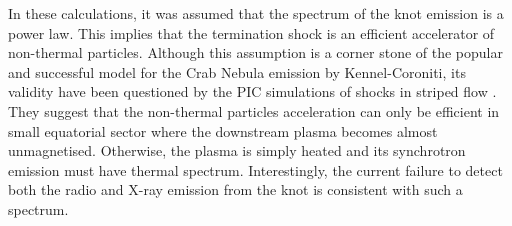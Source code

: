 In these calculations, it was assumed that the spectrum of the knot emission is a power law. This implies that the termination shock is an efficient accelerator of non-thermal particles. Although this assumption is a corner stone of the popular and successful model for the Crab Nebula emission by Kennel-Coroniti, its validity have been questioned by the PIC simulations of shocks in striped flow \citep{SS-11}. They suggest that the non-thermal particles acceleration can only be efficient in small equatorial sector where the downstream plasma becomes almost unmagnetised.  Otherwise, the plasma is simply heated and its synchrotron emission must have thermal spectrum.  Interestingly, the current failure to detect both the radio and X-ray emission from the knot  is consistent with such a spectrum.      
